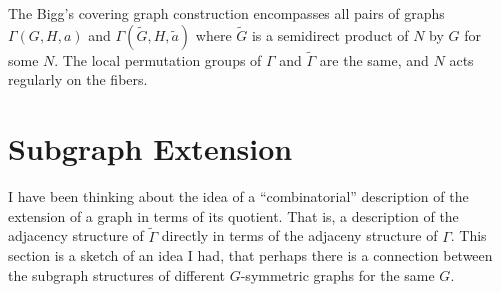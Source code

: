 

The Bigg's covering graph construction encompasses
all pairs of graphs $\Gamma(G, H, a)$ and $\Gamma(\widetilde{G}, H, \widetilde{a})$
where $\widetilde{G}$ is a semidirect product of $N$ by $G$ for some $N$.
The local permutation groups of $\Gamma$ and $\widetilde{\Gamma}$
are the same, and $N$ acts regularly on the fibers.



\section{Subgraph Extension}

I have been thinking about the idea of a ``combinatorial''
description of the extension of a graph in terms of its quotient.
That is, a description of the adjacency structure of $\widetilde{\Gamma}$
directly in terms of the adjaceny structure of $\Gamma$.
This section is a sketch of an idea I had, that perhaps
there is a connection between the subgraph structures
of different $G$-symmetric graphs for the same $G$.

